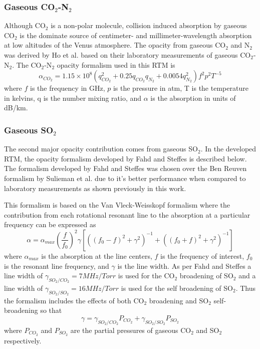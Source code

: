 \subsubsection{Gaseous CO$_2$-N$_2$}
Although CO$_2$ is a non-polar molecule, collision induced absorption by gaseous CO$_2$ \cite{Barrett-1960} is the dominate source of centimeter- and millimeter-wavelength absorption at low altitudes of the Venus atmosphere. The opacity from gaseous CO$_2$ and N$_2$  was derived by Ho et al. \cite{Ho-1966} based on their laboratory measurements of gaseous CO$_2$-N$_2$. The CO$_2$-N$_2$ opacity formalism used in this RTM is
\begin{equation}\label{eq:rtm-co2n2}
\alpha_{CO_2} = 1.15\times 10^8(q_{CO_2}^2 + 0.25q_{CO_2}q_{N_2} + 0.0054q_{N_2}^2)f^2p^2T^{-5}
\end{equation}
where $f$ is the frequency in GHz, $p$ is the pressure in atm, T is the temperature in kelvins, q is the number mixing ratio, and $\alpha$ is the absorption in units of dB/km.

\subsubsection{Gaseous SO$_2$}
The second major opacity contribution comes from gaseous SO$_2$. In the developed RTM, the opacity formalism developed by Fahd and Steffes \cite{Fahd-1991} is described below. The formalism developed by Fahd and Steffes was chosen over the Ben Reuven formalism by Sulieman et al. \cite{Suleiman-1996} due to it's better performance when compared to laboratory measurements as shown previously in this work.

This formalism is based on the Van Vleck-Weisskopf formalism where the contribution from each rotational resonant line to the absorption at a particular frequency can be expressed as 
\begin{equation}
\label{eq:rtm-so2fahd}
\alpha = \alpha_{max} \left(\frac{f}{f_0}\right)^2 \gamma [((f_0-f)^2+\gamma^2)^{-1}+((f_0+f)^2 + \gamma^2)^{-1}]
\end{equation}
where $\alpha_{max}$ is the absorption at the line centers, $f$ is the frequency of interest, $f_0$ is the resonant line frequency, and $\gamma$ is the line width. As per Fahd and Steffes \cite{Fahd-1991} a line width of $\gamma_{SO_2/CO_2} = 7MHz/Torr$ is used for the CO$_2$ broadening of SO$_2$ and a line width of $\gamma_{SO_2/SO_2} = 16MHz/Torr$ is used for the self broadening of SO$_2$. Thus the formalism includes the effects of both CO$_2$ broadening and SO$_2$ self-broadening so that
\begin{equation}
\gamma = \gamma_{SO_2/CO_2}P_{CO_2} + \gamma_{SO_2/SO_2}P_{SO_2}
\end{equation}
where $P_{CO_2}$ and $P_{SO_2}$ are the partial pressures of gaseous CO$_2$ and SO$_2$ respectively.

